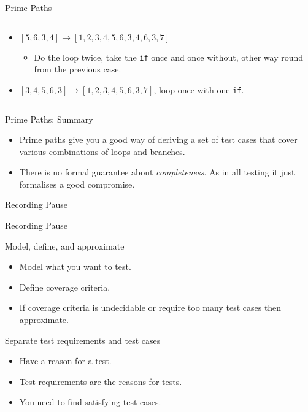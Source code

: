 \documentclass[handout]{beamer}
\newcommand{\recordingpause}{
\begin{frame}{Recording Pause}
  \begin{center}
    Recording Pause
  \end{center}
\end{frame}
}
\begin{document}
\begin{frame}{Prime Paths}
\begin{columns}
\begin{column}{0.7\textwidth}
\begin{itemize}
\begin{itemize}
    \end{itemize}
  \item $[5,6,3,4] \rightarrow   [1,2,3,4,5,6,3,4,6,3,7]$
    \begin{itemize}
    \item Do the loop twice, take the {\tt if} once and once without,
      other way round from the previous case.
    \end{itemize}
  \item $[3,4,5,6,3] \rightarrow [1,2,3,4,5,6,3,7]$, loop once with
    one {\tt if}.
  \end{itemize}
\end{column}
\end{columns}
\end{frame}

\begin{frame}{Prime Paths: Summary}
  \begin{itemize}
  \item Prime paths give you a good way of deriving a set of test
    cases that cover various combinations of loops and branches.
  \item There is no formal guarantee about {\it completeness}. As in all
    testing it just formalises a good compromise. 
  \end{itemize}

\end{frame}

\recordingpause

\begin{frame}{Model, define, and approximate}
  \begin{itemize}
  \item Model what you want to test.
  \item Define coverage criteria.
  \item If coverage criteria is undecidable or require too many test
    cases then approximate. 
  \end{itemize}
 \end{frame}
\begin{frame}{Separate test requirements and test cases}
  \begin{itemize}
  \item Have a reason for a test.
  \item Test requirements are the reasons for tests.
  \item You need to find satisfying test cases. 
  \end{itemize}
 
\end{frame}
\end{document}
